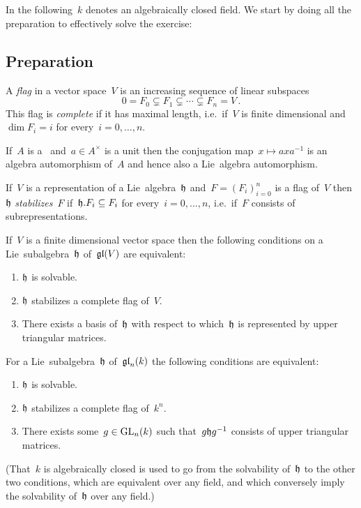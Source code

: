 \section{}

In the following~$k$ denotes an algebraically closed field.
We start by doing all the preparation to effectively solve the exercise:





\subsection*{Preparation}

\begin{definition}
  A \emph{flag} in a vector space~$V$ is an increasing sequence of linear subspaces
  \[
    0
    =
    F_0
    \subsetneq
    F_1
    \subsetneq
    \dotsb
    \subsetneq
    F_n
    =
    V \,.
  \]
  This flag is \emph{complete} if it has maximal length, i.e.\ if~$V$ is finite dimensional and~$\dim F_i = i$ for every~$i = 0, \dotsc, n$.
\end{definition}

\begin{recall}
  \label{conjugation is a lie algebra iso}
  If~$A$ is a~{} and~$a \in A^\times$ is a unit then the conjugation map~$x \mapsto a x a^{-1}$ is an algebra automorphism of~$A$ and hence also a Lie~algebra automorphism.
\end{recall}

\begin{recall}
  \label{recalling solvability via flags}
  If~$V$ is a representation of a Lie~algebra~$\mathfrak{h}$ and~$F = (F_i)_{i=0}^n$ is a flag of~$V$ then~$\mathfrak{h}$ \emph{stabilizes}~$F$ if~$\mathfrak{h}.F_i \subseteq F_i$ for every~$i = 0, \dotsc, n$, i.e.\ if~$F$ consists of subrepresentations.
  
  If~$V$ is a finite dimensional vector space then the following conditions on a Lie~subalgebra~$\mathfrak{h}$ of~$\mathfrak{gl}(V)$ are equivalent:
  \begin{enumerate}
    \item
      $\mathfrak{h}$ is solvable.
    \item
      $\mathfrak{h}$ stabilizes a complete flag of~$V$.
    \item
      There exists a basis of~$\mathfrak{h}$ with respect to which~$\mathfrak{h}$ is represented by upper triangular matrices.
  \end{enumerate}
  For a Lie~subalgebra~$\mathfrak{h}$ of~$\mathfrak{gl}_n(k)$ the following conditions are equivalent:
  \begin{enumerate}
    \item
      $\mathfrak{h}$ is solvable.
    \item
      $\mathfrak{h}$ stabilizes a complete flag of~$k^n$.
    \item
      There exists some~$g \in \operatorname{GL}_n(k)$ such that~$g \mathfrak{h} g^{-1}$ consists of upper triangular matrices.
  \end{enumerate}
  (That~$k$ is algebraically closed is used to go from the solvability of~$\mathfrak{h}$ to the other two conditions, which are equivalent over any field, and which conversely imply the solvability of~$\mathfrak{h}$ over any field.)
\end{recall}

